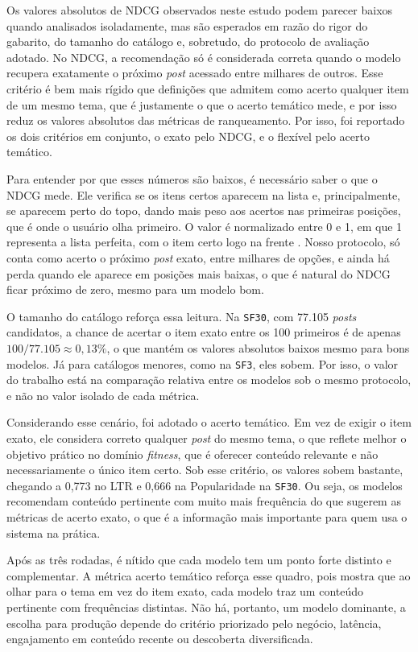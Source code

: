 \documentclass[a4paper,12pt]{article}
\begin{document}
{Os valores absolutos de NDCG observados neste estudo podem parecer baixos quando analisados isoladamente, mas são esperados em razão do rigor do gabarito, do tamanho do catálogo e, sobretudo, do protocolo de avaliação adotado. No NDCG, a recomendação só é considerada correta quando o modelo recupera exatamente o próximo \textit{post} acessado entre milhares de outros. Esse critério é bem mais rígido que definições que admitem como acerto qualquer item de um mesmo tema, que é justamente o que o acerto temático mede, e por isso reduz os valores absolutos das métricas de ranqueamento. Por isso, foi reportado os dois critérios em conjunto, o exato pelo NDCG, e o flexível pelo acerto temático.

Para entender por que esses números são baixos, é necessário saber o que o NDCG mede. Ele verifica se os itens certos aparecem na lista e, principalmente, se aparecem perto do topo, dando mais peso aos acertos nas primeiras posições, que é onde o usuário olha primeiro. O valor é normalizado entre 0 e 1, em que 1 representa a lista perfeita, com o item certo logo na frente \cite{Jarvelin2002NDCG}. Nosso protocolo, só conta como acerto o próximo \textit{post} exato, entre milhares de opções, e ainda há perda quando ele aparece em posições mais baixas, o que é natural do NDCG ficar próximo de zero, mesmo para um modelo bom.

O tamanho do catálogo reforça essa leitura. Na \texttt{SF30}, com 77.105 \textit{posts} candidatos, a chance de acertar o item exato entre os 100 primeiros é de apenas \(100/77.105 \approx 0{,}13\%\), o que mantém os valores absolutos baixos mesmo para bons modelos. Já para catálogos menores, como na \texttt{SF3}, eles sobem. Por isso, o valor do trabalho está na comparação relativa entre os modelos sob o mesmo protocolo, e não no valor isolado de cada métrica.

Considerando esse cenário, foi adotado o acerto temático. Em vez de exigir o item exato, ele considera correto qualquer \textit{post} do mesmo tema, o que reflete melhor o objetivo prático no domínio \textit{fitness}, que é oferecer conteúdo relevante e não necessariamente o único item certo. Sob esse critério, os valores sobem bastante, chegando a 0,773 no LTR e 0,666 na Popularidade na \texttt{SF30}. Ou seja, os modelos recomendam conteúdo pertinente com muito mais frequência do que sugerem as métricas de acerto exato, o que é a informação mais importante para quem usa o sistema na prática.

Após as três rodadas, é nítido que cada modelo tem um ponto forte distinto e complementar. A métrica acerto temático reforça esse quadro, pois mostra que ao olhar para o tema em vez do item exato, cada modelo traz um conteúdo pertinente com frequências distintas. Não há, portanto, um modelo dominante, a escolha para produção depende do critério priorizado pelo negócio, latência, engajamento em conteúdo recente ou descoberta diversificada.

}
\end{document}
